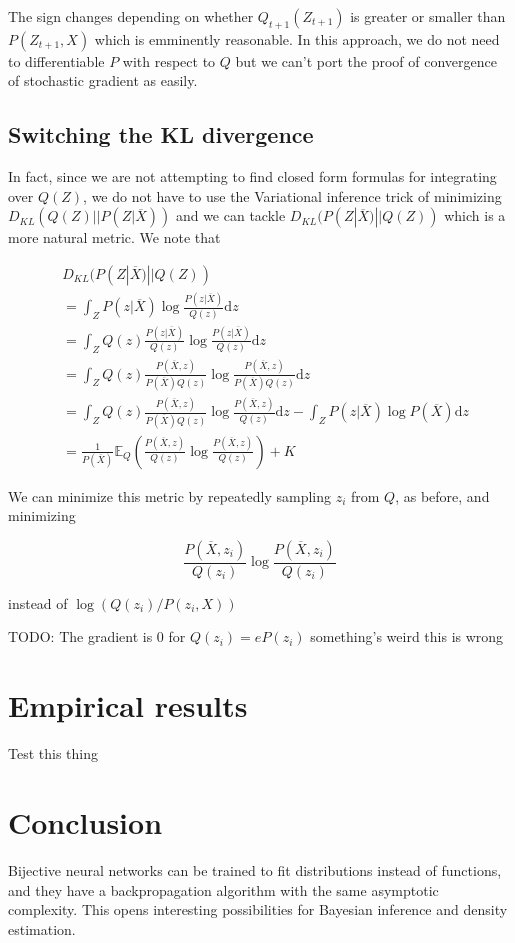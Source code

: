\documentclass{article}
\begin{document}
The sign changes depending on whether \(Q_{t+1}(Z_{t+1})\) is greater or
smaller than \(P(Z_{t+1},X)\) which is emminently reasonable. In this
approach, we do not need to differentiable \(P\) with respect to \(Q\)
but we can't port the proof of convergence of stochastic gradient
as easily.

\subsection{Switching the KL divergence}

In fact, since we are not attempting to find closed form formulas for
integrating over \(Q(Z)\), we do not have to use the Variational inference
trick of minimizing \(D_{KL}(Q(Z)||P(Z|\overline{X}))\) and we can tackle
\(D_{KL}(P(Z|\overline{X})||Q(Z))\) which is a more natural metric. We note that

\[
\begin{aligned}
  & D_{KL}(P(Z|\overline{X})|| Q(Z)) \\
  &= \int_Z P(z|\overline{X}) \log \frac{P(z|\overline{X})}{Q(z)} \mathrm{d}z \\
  &= \int_Z Q(z) \frac{P(z|\overline{X})}{Q(z)} \log \frac{P(z|\overline{X})}{Q(z)}  \mathrm{d}z \\
  &= \int_Z Q(z) \frac{P(\overline{X}, z)}{P(\overline{X})Q(z)} \log \frac{P(\overline{X}, z)}{P(\overline{X})Q(z)}  \mathrm{d}z \\
  &= \int_Z Q(z) \frac{P(\overline{X}, z)}{P(\overline{X})Q(z)} \log \frac{P(\overline{X}, z)}{Q(z)}  \mathrm{d}z
  - \int_Z P(z|\overline{X}) \log P(\overline{X})  \mathrm{d}z \\
  &= \frac{1}{P(\overline{X})}\mathbb{E}_{Q} \left( \frac{P(\overline{X}, z)}{Q(z)} \log \frac{P(\overline{X}, z)}{Q(z)}\right) + K
\end{aligned}
\]

We can minimize this metric by repeatedly sampling \(z_i\) from \(Q\),
as before, and minimizing

\[
  \frac{P(\overline{X}, z_i)}{Q(z_i)} \log \frac{P(\overline{X}, z_i)}{Q(z_i)}
\]

instead of \(\log(Q(z_i)/P(z_i, X))\)

TODO: The gradient is 0 for \(Q(z_i) = e P(z_i)\) something's weird this is wrong


\section{Empirical results}

Test this thing


\section{Conclusion}

Bijective neural networks can be trained to fit distributions instead of
functions, and they have a backpropagation algorithm with the same asymptotic
complexity. This opens interesting possibilities for Bayesian inference and
density estimation.
\end{document}
